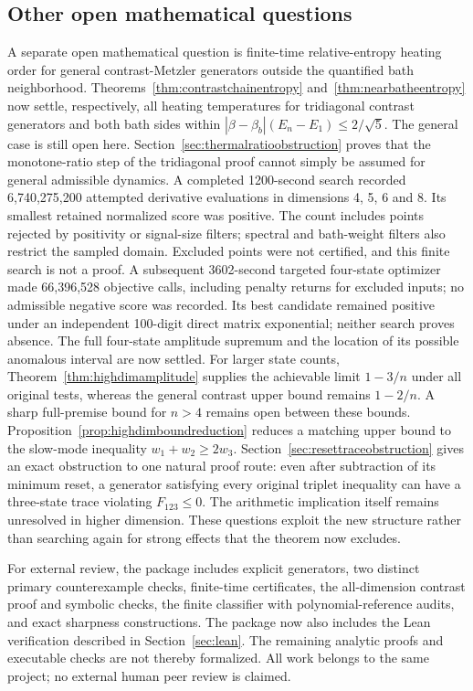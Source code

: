 \documentclass[11pt]{article}
\begin{document}
\subsection{Other open mathematical questions}
A separate open mathematical question is finite-time relative-entropy heating order for general contrast-Metzler generators outside the quantified bath neighborhood. Theorems~\ref{thm:contrastchainentropy} and~\ref{thm:nearbatheentropy} now settle, respectively, all heating temperatures for tridiagonal contrast generators and both bath sides within $|\beta-\beta_b|(E_n-E_1)\leq2/\sqrt5$. The general case is still open here. Section~\ref{sec:thermalratioobstruction} proves that the monotone-ratio step of the tridiagonal proof cannot simply be assumed for general admissible dynamics. A completed 1200-second search recorded 6,740,275,200 attempted derivative evaluations in dimensions 4, 5, 6 and 8. Its smallest retained normalized score was positive. The count includes points rejected by positivity or signal-size filters; spectral and bath-weight filters also restrict the sampled domain. Excluded points were not certified, and this finite search is not a proof. A subsequent 3602-second targeted four-state optimizer made 66,396,528 objective calls, including penalty returns for excluded inputs; no admissible negative score was recorded. Its best candidate remained positive under an independent 100-digit direct matrix exponential; neither search proves absence. The full four-state amplitude supremum and the location of its possible anomalous interval are now settled. For larger state counts, Theorem~\ref{thm:highdimamplitude} supplies the achievable limit $1-3/n$ under all original tests, whereas the general contrast upper bound remains $1-2/n$. A sharp full-premise bound for $n>4$ remains open between these bounds. Proposition~\ref{prop:highdimboundreduction} reduces a matching upper bound to the slow-mode inequality $w_1+w_2\geq2w_3$. Section~\ref{sec:resettraceobstruction} gives an exact obstruction to one natural proof route: even after subtraction of its minimum reset, a generator satisfying every original triplet inequality can have a three-state trace violating $F_{123}\leq0$. The arithmetic implication itself remains unresolved in higher dimension. These questions exploit the new structure rather than searching again for strong effects that the theorem now excludes.

For external review, the package includes explicit generators, two distinct primary counterexample checks, finite-time certificates, the all-dimension contrast proof and symbolic checks, the finite classifier with polynomial-reference audits, and exact sharpness constructions. The package now also includes the Lean verification described in Section~\ref{sec:lean}. The remaining analytic proofs and executable checks are not thereby formalized. All work belongs to the same project; no external human peer review is claimed.
\end{document}

